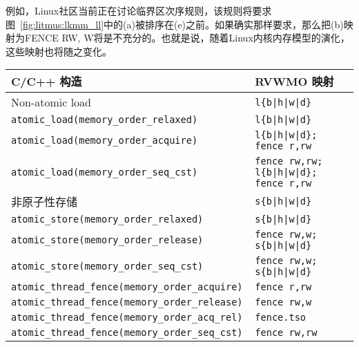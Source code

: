 例如，Linux社区当前正在讨论临界区次序规则，该规则将要求图~\ref{fig:litmus:lkmm_ll}中的(a)被排序在(e)之前。如果确实那样要求，那么把(b)映射为FENCE RW, W将是不充分的。也就是说，随着Linux内核内存模型的演化，这些映射也将随之变化。

\begin{table}[h!]
  \centering
  \begin{tabular}{|l|l|}
    \hline
    C/C++ 构造                            & RVWMO 映射 \\
    \hline
    \hline
    Non-atomic load                            & \tt l\{b|h|w|d\}               \\
    \hline
    \tt atomic\_load(memory\_order\_relaxed)   & \tt l\{b|h|w|d\}               \\
    \hline
    \tt atomic\_load(memory\_order\_acquire)   & \tt l\{b|h|w|d\}; fence r,rw    \\
    \hline
    \tt atomic\_load(memory\_order\_seq\_cst)  & \tt fence rw,rw; l\{b|h|w|d\}; fence r,rw       \\
    \hline
    \hline
    非原子性存储                           & \tt s\{b|h|w|d\}               \\
    \hline
    \tt atomic\_store(memory\_order\_relaxed)  & \tt s\{b|h|w|d\}               \\
    \hline
    \tt atomic\_store(memory\_order\_release)  & \tt fence rw,w; s\{b|h|w|d\}  \\
    \hline
    \tt atomic\_store(memory\_order\_seq\_cst) & \tt fence rw,w; s\{b|h|w|d\}  \\
    \hline
    \hline
    \tt atomic\_thread\_fence(memory\_order\_acquire)  & \tt fence r,rw \\
    \hline
    \tt atomic\_thread\_fence(memory\_order\_release)  & \tt fence rw,w \\
    \hline
    \tt atomic\_thread\_fence(memory\_order\_acq\_rel) & {\tt fence.tso} \\
    \hline
    \tt atomic\_thread\_fence(memory\_order\_seq\_cst) & \tt fence rw,rw \\

\end{tabular}
\end{table}
